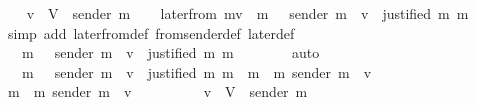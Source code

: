 \begin{isabellebody}
\ \ \isamarkupfalse%
\ {\isachardoublequoteopen}v\ {\isasymin}\ V\ {\isacharminus}\ {\isacharbraceleft}sender\ m{\isacharprime}{\isacharbraceright}{\isachardoublequoteclose}\isanewline
\isanewline
\ \ \isamarkupfalse%
\ {\isachardoublequoteopen}later{\isacharunderscore}from\ {\isacharparenleft}m{\isacharcomma}v{\isacharcomma}{\isasymsigma}{\isacharparenright}\ {\isacharequal}\ {\isacharbraceleft}m{\isacharprime}{\isacharprime}\ {\isasymin}\ {\isasymsigma}{\isachardot}\ sender\ m{\isacharprime}{\isacharprime}\ {\isacharequal}\ v\ {\isasymand}\ justified\ m\ m{\isacharprime}{\isacharprime}{\isacharbraceright}{\isachardoublequoteclose}\isanewline
\ \ \ \ \isamarkupfalse%
\ {\isacharparenleft}simp\ add{\isacharcolon}\ later{\isacharunderscore}from{\isacharunderscore}def\ from{\isacharunderscore}sender{\isacharunderscore}def\ later{\isacharunderscore}def{\isacharparenright}\isanewline
\ \ \isamarkupfalse%
\ \isamarkupfalse%
\ {\isachardoublequoteopen}{\isasymdots}\ {\isacharequal}\ {\isacharbraceleft}m{\isacharprime}{\isacharprime}\ {\isasymin}\ {\isasymsigma}{\isachardot}\ sender\ m{\isacharprime}{\isacharprime}\ {\isacharequal}\ v\ {\isasymand}\ justified\ m\ m{\isacharprime}{\isacharprime}{\isacharbraceright}\ {\isasymunion}\ {\isasymemptyset}{\isachardoublequoteclose}\isanewline
\ \ \ \ \isamarkupfalse%
\ auto\ \ \ \ \isanewline
\ \ \isamarkupfalse%
\ \isamarkupfalse%
\ {\isachardoublequoteopen}{\isasymdots}\ {\isacharequal}\ {\isacharbraceleft}m{\isacharprime}{\isacharprime}\ {\isasymin}\ {\isasymsigma}{\isachardot}\ sender\ m{\isacharprime}{\isacharprime}\ {\isacharequal}\ v\ {\isasymand}\ justified\ m\ m{\isacharprime}{\isacharprime}{\isacharbraceright}\ {\isasymunion}\ {\isacharbraceleft}m{\isacharprime}{\isacharprime}\ {\isasymin}\ {\isacharbraceleft}m{\isacharprime}{\isacharbraceright}{\isachardot}\ sender\ m{\isacharprime}{\isacharprime}\ {\isacharequal}\ v{\isacharbraceright}{\isachardoublequoteclose}\isanewline
\ \ \isamarkupfalse%
{\isacharminus}\isanewline
\ \ \ \ \isamarkupfalse%
\ {\isachardoublequoteopen}{\isacharbraceleft}m{\isacharprime}{\isacharprime}\ {\isasymin}\ {\isacharbraceleft}m{\isacharprime}{\isacharbraceright}{\isachardot}\ sender\ m{\isacharprime}{\isacharprime}\ {\isacharequal}\ v{\isacharbraceright}\ {\isacharequal}\ {\isasymemptyset}{\isachardoublequoteclose}\isanewline
\ \ \ \ \ \ \isamarkupfalse%
\ {\isacartoucheopen}v\ {\isasymin}\ V\ {\isacharminus}\ {\isacharbraceleft}sender\ m{\isacharprime}{\isacharbraceright}{\isacartoucheclose}\ \isamarkupfalse%

\end{isabellebody}
